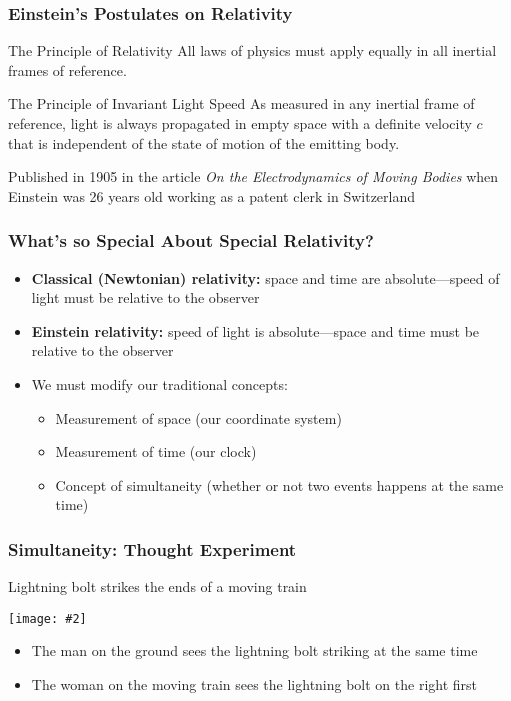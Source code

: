 \documentclass[12pt,compress,aspectratio=169]{beamer}
\newcommand{\pic}[2]{\texttt{[image: \#2]}}
\begin{document}
\begin{frame}
  \frametitle{Einstein's Postulates on Relativity}
  \begin{block}{The Principle of Relativity}
    All laws of physics must apply equally in all inertial frames of reference.
  \end{block}

  \begin{block}{The Principle of Invariant Light Speed}
    As measured in any inertial frame of reference, light is always propagated
    in empty space with a definite velocity $c$ that is independent of the
    state of motion of the emitting body.
  \end{block}
  
  \vspace{.15in}Published in 1905 in the article
  \emph{On the Electrodynamics of Moving Bodies} when Einstein was 26 years old
  working as a patent clerk in Switzerland
\end{frame}


\begin{frame}
  \frametitle{What's so Special About Special Relativity?}
  \begin{itemize}
  \item\textbf{Classical (Newtonian) relativity:} space and time are
    absolute---speed of light must be relative to the observer
  \item\textbf{Einstein relativity:} speed of light is absolute---space and
    time must be relative to the observer
  \item We must modify our traditional concepts:
    \begin{itemize}
    \item Measurement of space (our coordinate system)
    \item Measurement of time (our clock)
    \item Concept of simultaneity (whether or not two events happens at the
      same time)
    \end{itemize}
  \end{itemize}
\end{frame}



\begin{frame}
  \frametitle{Simultaneity: Thought Experiment}
  Lightning bolt strikes the ends of a moving train
  \begin{center}
    \pic{.58}{87-1-1024x673.png}
  \end{center}
  \vspace{-0.1in}
  \begin{itemize}
  \item The man on the ground sees the lightning bolt striking at the same time
  \item The woman on the moving train sees the lightning bolt on the right first
  \end{itemize}
\end{frame}
\end{document}
